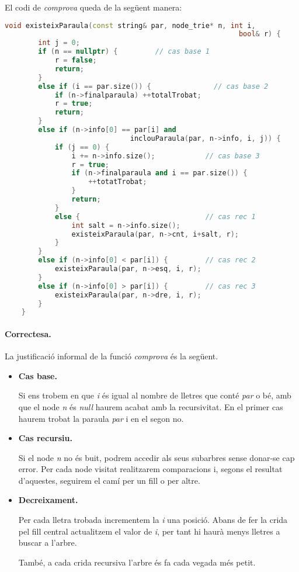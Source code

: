 \documentclass[titlepage]{article}
\begin{document}
El codi de \textit{comprova} queda de la següent manera:

\begin{lstlisting}[language=C++]
    void existeixParaula(const string& par, node_trie* n, int i, 
                                                        bool& r) {
        int j = 0;
        if (n == nullptr) {         // cas base 1
            r = false;
            return;
        }
        else if (i == par.size()) {               // cas base 2
            if (n->finalparaula) ++totalTrobat;
            r = true;
            return;
        }
        else if (n->info[0] == par[i] and 
                              inclouParaula(par, n->info, i, j)) {
            if (j == 0) {
                i += n->info.size();            // cas base 3
                r = true;
                if (n->finalparaula and i == par.size()) {
                    ++totatTrobat;
                }
                return;
            }
            else {                              // cas rec 1
                int salt = n->info.size();
                existeixParaula(par, n->cnt, i+salt, r);
            }
        }
        else if (n->info[0] < par[i]) {         // cas rec 2
            existeixParaula(par, n->esq, i, r);
        }
        else if (n->info[0] > par[i]) {         // cas rec 3
            existeixParaula(par, n->dre, i, r);
        }
    }
\end{lstlisting}

\paragraph{Correctesa.} La justificació informal de la funció \textit{comprova} és la següent.
\begin{itemize}
    \item \textbf{Cas base.}\par
    Si ens trobem en que \textit{i} és igual al nombre de lletres que conté \textit{par} o bé, amb que el node \textit{n} és \textit{null} haurem acabat amb la recursivitat. En el primer cas haurem trobat la paraula \textit{par} i en el segon no.
    \item \textbf{Cas recursiu.}\par
    Si el node \textit{n} no és buit, podrem accedir als seus subarbres sense donar-se cap error. Per cada node visitat realitzarem comparacions i, segons el resultat d'aquestes, seguirem el camí per un fill o per altre.
    \item \textbf{Decreixament.}\par
    Per cada lletra trobada incrementem la \textit{i} una posició. Abans de fer la crida pel fill central actualitzem el valor de \textit{i}, per tant hi haurà menys lletres a buscar a l'arbre.\par
    També, a cada crida recursiva l'arbre és fa cada vegada més petit.
\end{itemize}
\end{document}
